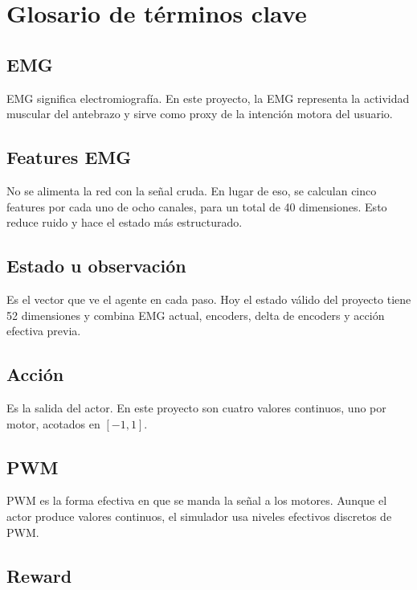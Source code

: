 \documentclass[11pt,a4paper]{article}
\begin{document}
\section{Glosario de t\'erminos clave}

\subsection{EMG}

EMG significa electromiograf\'ia. En este proyecto, la EMG representa la actividad muscular del antebrazo y sirve como proxy de la intenci\'on motora del usuario.

\subsection{Features EMG}

No se alimenta la red con la se\~nal cruda. En lugar de eso, se calculan cinco features por cada uno de ocho canales, para un total de 40 dimensiones. Esto reduce ruido y hace el estado m\'as estructurado.

\subsection{Estado u observaci\'on}

Es el vector que ve el agente en cada paso. Hoy el estado v\'alido del proyecto tiene 52 dimensiones y combina EMG actual, encoders, delta de encoders y acci\'on efectiva previa.

\subsection{Acci\'on}

Es la salida del actor. En este proyecto son cuatro valores continuos, uno por motor, acotados en \([-1,1]\).

\subsection{PWM}

PWM es la forma efectiva en que se manda la se\~nal a los motores. Aunque el actor produce valores continuos, el simulador usa niveles efectivos discretos de PWM.

\subsection{Reward}
\end{document}
